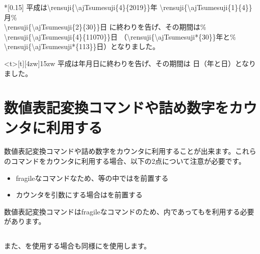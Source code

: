 \documentclass[uplatex, dvipdfmx, paper=a4paper, line_length=45zw, head_space=7zw, foot_space=10zw]{jlreq}
\begin{document}
\begin{demosource}*[0.15]
  平成は{\textbackslash}rensuji\{\textbackslash{ajTsumesuji}\{4\}\{2019\}\}年
  {\textbackslash}rensuji\{\textbackslash{ajTsumesuji}\{1\}\{4\}\}月\%\\
  {\textbackslash}rensuji\{\textbackslash{ajTsumesuji}\{2\}\{30\}\}日
  に終わりを告げ、その期間は\%\\
  {\textbackslash}rensuji\{\textbackslash{ajTsumesuji}\{4\}\{11070\}\}日
  （{\textbackslash}rensuji\{\textbackslash{ajTsumesuji}*\{30\}\}年と\%\\
  {\textbackslash}rensuji\{\textbackslash{ajTsumesuji}*\{113\}\}日）となりました。
  \tcblower
  \begin{minipage}<t>[t][4zw]{15zw}
    平成は年月日に終わりを告げ、その期間は
    日（年と日）となりました。
  \end{minipage}
\end{demosource}

\section{数値表記変換コマンドや詰め数字をカウンタに利用する}

数値表記変換コマンドや詰め数字をカウンタに利用することが出来ます。これらのコマンドをカウンタに利用する場合、以下の2点について注意が必要です。

\begin{itemize}
  \item fragileなコマンドなため、等の中ではを前置する
  \item カウンタを引数にする場合はを前置する
\end{itemize}

数値表記変換コマンドはfragileなコマンドのため、内であってもを利用する必要があります。

\begin{texsource}
\section{\protect{}}
\end{texsource}

また、を使用する場合も同様にを使用します。
\end{document}
